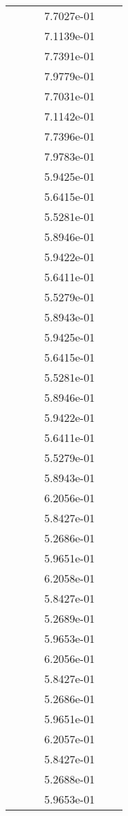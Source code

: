 \begin{xltabular}{\textwidth}{r|rS[table-format=1.3e+2]S[table-format=1.4e+2]S[table-format=1.4e+2]S[table-format=-1.5]}
&  &  & 7.7027e-01 & & \\
&  &  & 7.1139e-01 & & \\
&  &  & 7.7391e-01 & & \\
&  &  & 7.9779e-01 & & \\
&  &  & 7.7031e-01 & & \\
&  &  & 7.1142e-01 & & \\
&  &  & 7.7396e-01 & & \\
&  &  & 7.9783e-01 & & \\
&  &  & 5.9425e-01 & & \\
&  &  & 5.6415e-01 & & \\
&  &  & 5.5281e-01 & & \\
&  &  & 5.8946e-01 & & \\
&  &  & 5.9422e-01 & & \\
&  &  & 5.6411e-01 & & \\
&  &  & 5.5279e-01 & & \\
&  &  & 5.8943e-01 & & \\
&  &  & 5.9425e-01 & & \\
&  &  & 5.6415e-01 & & \\
&  &  & 5.5281e-01 & & \\
&  &  & 5.8946e-01 & & \\
&  &  & 5.9422e-01 & & \\
&  &  & 5.6411e-01 & & \\
&  &  & 5.5279e-01 & & \\
&  &  & 5.8943e-01 & & \\
&  &  & 6.2056e-01 & & \\
&  &  & 5.8427e-01 & & \\
&  &  & 5.2686e-01 & & \\
&  &  & 5.9651e-01 & & \\
&  &  & 6.2058e-01 & & \\
&  &  & 5.8427e-01 & & \\
&  &  & 5.2689e-01 & & \\
&  &  & 5.9653e-01 & & \\
&  &  & 6.2056e-01 & & \\
&  &  & 5.8427e-01 & & \\
&  &  & 5.2686e-01 & & \\
&  &  & 5.9651e-01 & & \\
&  &  & 6.2057e-01 & & \\
&  &  & 5.8427e-01 & & \\
&  &  & 5.2688e-01 & & \\
&  &  & 5.9653e-01 & & \\

\end{xltabular}
